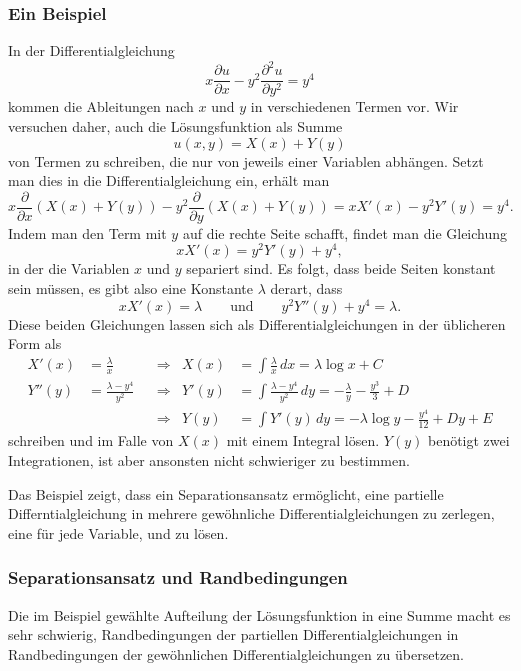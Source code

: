 \subsubsection{Ein Beispiel}
In der Differentialgleichung
\[
x\frac{\partial u}{\partial x}
-
y^2\frac{\partial^2 u}{\partial y^2}
=
y^4
\]
kommen die Ableitungen nach $x$ und $y$ in verschiedenen Termen vor.
Wir versuchen daher, auch die Lösungsfunktion als Summe
\[
u(x,y) = X(x) + Y(y)
\]
von Termen zu schreiben, die nur von jeweils einer Variablen abhängen.
Setzt man dies in die Differentialgleichung ein, erhält man
\[
x\frac{\partial}{\partial x}(X(x)+Y(y))
-y^2\frac{\partial}{\partial y}(X(x)+Y(y))
=
xX'(x) -y^2Y'(y)
=
y^4.
\]
Indem man den Term mit $y$ auf die rechte Seite schafft, findet man
die Gleichung
\[
xX'(x) = y^2Y'(y) + y^4,
\]
in der die Variablen $x$ und $y$ separiert sind.
Es folgt, dass beide Seiten konstant sein müssen, es gibt also eine
Konstante $\lambda$ derart, dass
\[
xX'(x) = \lambda
\qquad\text{und}\qquad
y^2Y''(y) +y^4 = \lambda.
\]
Diese beiden Gleichungen lassen sich als Differentialgleichungen in
der üblicheren Form als
\begin{align*}
X'(x) &= \frac{\lambda}{x}
&&\Rightarrow&
X(x) &= \int \frac{\lambda}{x}\,dx = \lambda \log x + C
\\
Y''(y) &= \frac{\lambda - y^4}{y^2}
&&\Rightarrow&
Y'(y)
&=
\int \frac{\lambda-y^4}{y^2}\,dy
=
-\frac{\lambda}{y}-\frac{y^3}3 + D
\\
&
&&\Rightarrow&
Y(y)
&=
\int Y'(y)\,dy
=
-\lambda \log y - \frac{y^4}{12} +Dy +E
\end{align*}
schreiben und im Falle von $X(x)$ mit einem Integral lösen.
$Y(y)$ benötigt zwei Integrationen, ist aber ansonsten nicht
schwieriger zu bestimmen.

Das Beispiel zeigt, dass ein Separationsansatz ermöglicht, eine
partielle Differntialgleichung in mehrere gewöhnliche Differentialgleichungen
zu zerlegen, eine für jede Variable, und zu lösen.

%
%
\subsubsection{Separationsansatz und Randbedingungen}
Die im Beispiel gewählte Aufteilung der Lösungsfunktion in eine
Summe macht es sehr schwierig, Randbedingungen der partiellen
Differentialgleichungen in Randbedingungen der gewöhnlichen
Differentialgleichungen zu übersetzen.

